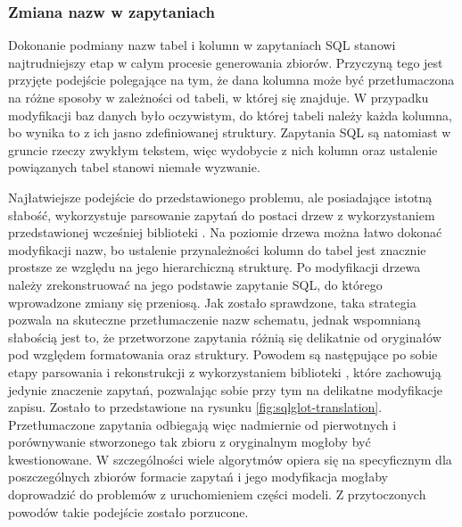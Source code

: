
\subsubsection{Zmiana nazw w zapytaniach}
Dokonanie podmiany nazw tabel i kolumn w zapytaniach SQL stanowi najtrudniejszy etap w całym procesie generowania zbiorów. Przyczyną tego jest przyjęte podejście polegające na tym, że dana kolumna może być przetłumaczona na różne sposoby w zależności od tabeli, w której się znajduje. W przypadku modyfikacji baz danych było oczywistym, do której tabeli należy każda kolumna, bo wynika to z ich jasno zdefiniowanej struktury. Zapytania SQL są natomiast w gruncie rzeczy zwykłym tekstem, więc wydobycie z nich kolumn oraz ustalenie powiązanych tabel stanowi niemałe wyzwanie.

Najłatwiejsze podejście do przedstawionego problemu, ale posiadające istotną słabość, wykorzystuje parsowanie zapytań do postaci drzew  z wykorzystaniem przedstawionej wcześniej biblioteki . Na poziomie drzewa można łatwo dokonać modyfikacji nazw, bo ustalenie przynależności kolumn do tabel jest znacznie prostsze ze względu na jego hierarchiczną strukturę. Po modyfikacji drzewa należy zrekonstruować na jego podstawie zapytanie SQL, do którego wprowadzone zmiany się przeniosą. Jak zostało sprawdzone, taka strategia pozwala na skuteczne przetłumaczenie nazw schematu, jednak wspomnianą słabością jest to, że przetworzone zapytania różnią się delikatnie od oryginałów pod względem formatowania oraz struktury. Powodem są następujące po sobie etapy parsowania i rekonstrukcji z wykorzystaniem biblioteki , które zachowują jedynie znaczenie zapytań, pozwalając sobie przy tym na delikatne modyfikacje zapisu. Zostało to przedstawione na rysunku \ref{fig:sqlglot-translation}. Przetłumaczone zapytania odbiegają więc nadmiernie od pierwotnych i porównywanie stworzonego tak zbioru z oryginalnym mogłoby być kwestionowane. W szczególności wiele algorytmów opiera się na specyficznym dla poszczególnych zbiorów formacie zapytań i jego modyfikacja mogłaby doprowadzić do problemów z uruchomieniem części modeli. Z przytoczonych powodów takie podejście zostało porzucone.

